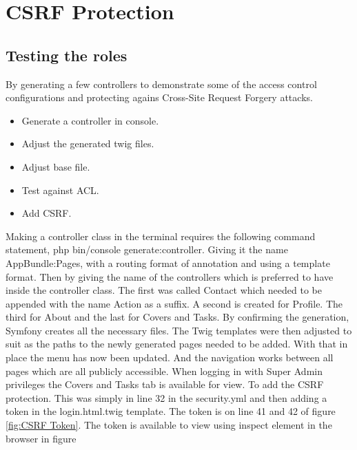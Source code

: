 \section{CSRF Protection}

\subsection{Testing the roles}

By generating a few controllers to demonstrate some of the access control configurations and protecting agains Cross-Site Request Forgery attacks.

\begin{itemize}
  \item Generate a controller in console.
    \item Adjust the generated twig files.
      \item Adjust base file.
        \item Test against ACL.
          \item Add CSRF.
\end{itemize}

Making a controller class in the terminal requires the following command statement, php bin/console generate:controller. Giving it the name AppBundle:Pages, with a routing format of annotation and using a template format. Then by giving the name of the controllers which is preferred to have inside the controller class. The first was called Contact which needed to be appended with the name Action as a suffix. A second is created for Profile. The third for About and the last for Covers and Tasks. By confirming the generation, Symfony creates all the necessary files. The Twig templates were then adjusted to suit as the paths to the newly generated pages needed to be added. With that in place the menu has now been updated. And the navigation works between all pages which are all publicly accessible. When logging in with Super Admin privileges the Covers and Tasks tab is available for view. To add the CSRF protection. This was simply in line 32 in the security.yml and then adding a token in the login.html.twig template. The token is on line 41 and 42 of figure \ref{fig:CSRF Token}. The token is available to view using inspect element in the browser in figure 

